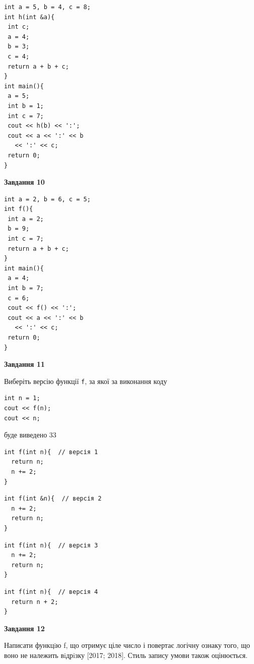 \documentclass[12pt, ukrainian]{article}
\def\code#1{\Verb!#1!}
\begin{document}
{\begin {large}
\begin{minipage}[t]{7.0cm}
\begin{verbatim}
int a = 5, b = 4, c = 8;
int h(int &a){
 int c;
 a = 4;
 b = 3;
 c = 4;
 return a + b + c;
}
int main(){
 a = 5;
 int b = 1;
 int c = 7;
 cout << h(b) << ':';
 cout << a << ':' << b 
   << ':' << c;
 return 0;
}
\end{verbatim}



\begin{center}
\textbf{Завдання 10}
\end{center}
\vspace{-8mm}

\begin{verbatim}
int a = 2, b = 6, c = 5;
int f(){
 int a = 2;
 b = 9;
 int c = 7;
 return a + b + c;
}
int main(){
 a = 4;
 int b = 7;
 c = 6;
 cout << f() << ':';
 cout << a << ':' << b 
   << ':' << c;
 return 0;
}
\end{verbatim}

\end{minipage}
\vline \hspace{1mm}
\begin{minipage}[t]{11.0cm}

\begin{center}
\textbf{Завдання 11}
\end{center}
Виберіть версію функції \code{f}, за якої за виконання коду
\begin{verbatim}
int n = 1;
cout << f(n);
cout << n;
\end{verbatim}

буде виведено 33

\begin{verbatim}
int f(int n){  // версія 1
  return n;
  n += 2;
}
\end{verbatim}

\vspace{-8mm}\begin{verbatim}
int f(int &n){  // версія 2
  n += 2;
  return n;
}
\end{verbatim}

\vspace{-8mm}\begin{verbatim}
int f(int n){  // версія 3
  n += 2;
  return n;
}
\end{verbatim}

\vspace{-8mm}\begin{verbatim}
int f(int n){  // версія 4
  return n + 2;
}
\end{verbatim}



\begin{center}
\textbf{Завдання 12}
\end{center}

Написати функцiю f, що отримує ціле число і повертає логічну ознаку того, що воно не належить вiдрiзку [2017; 2018]. Стиль запису умови також оцінюється.\par

\end{minipage}

\end {large}}
\newpage
\end{document}
